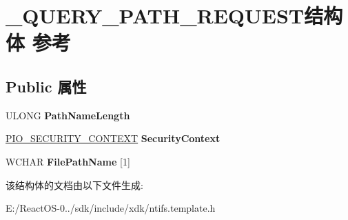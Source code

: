 \hypertarget{struct___q_u_e_r_y___p_a_t_h___r_e_q_u_e_s_t}{}\section{\+\_\+\+Q\+U\+E\+R\+Y\+\_\+\+P\+A\+T\+H\+\_\+\+R\+E\+Q\+U\+E\+S\+T结构体 参考}
\label{struct___q_u_e_r_y___p_a_t_h___r_e_q_u_e_s_t}
\subsection*{Public 属性}
\begin{DoxyCompactItemize}
\item 
\mbox{\label{struct___q_u_e_r_y___p_a_t_h___r_e_q_u_e_s_t_a66b9396b1d9d94b3dbecebb74f976e1a}} 
U\+L\+O\+NG {\bfseries Path\+Name\+Length}
\item 
\mbox{\label{struct___q_u_e_r_y___p_a_t_h___r_e_q_u_e_s_t_a013d471c26847c423d34ec42c370a38d}} 
\hyperlink{struct___i_o___s_e_c_u_r_i_t_y___c_o_n_t_e_x_t}{P\+I\+O\+\_\+\+S\+E\+C\+U\+R\+I\+T\+Y\+\_\+\+C\+O\+N\+T\+E\+XT} {\bfseries Security\+Context}
\item 
\mbox{\label{struct___q_u_e_r_y___p_a_t_h___r_e_q_u_e_s_t_aa3be0a0abeb611b77d64c6af56d967ac}} 
W\+C\+H\+AR {\bfseries File\+Path\+Name} \mbox{[}1\mbox{]}
\end{DoxyCompactItemize}


该结构体的文档由以下文件生成\+:\begin{DoxyCompactItemize}
\item 
E\+:/\+React\+O\+S-\/0../sdk/include/xdk/ntifs.\+template.\+h\end{DoxyCompactItemize}
